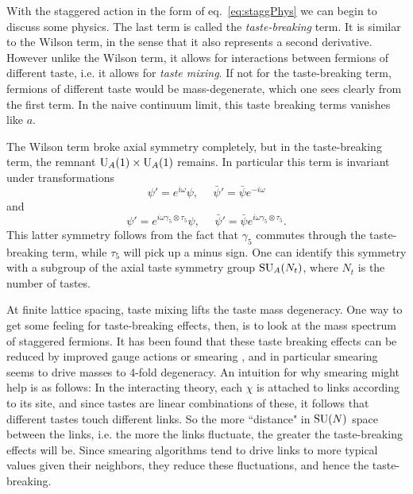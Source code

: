 With the staggered action in the form of eq.~\eqref{eq:staggPhys} we can
begin to discuss some physics. The last term is called the
{\it taste-breaking} term. It is similar to the Wilson term, in the
sense that it also represents a second derivative. However unlike
the Wilson term, it allows for interactions between fermions of
different taste, i.e. it allows for {\it taste mixing}. If not for
the taste-breaking term, fermions of different taste would be mass-degenerate,
which one sees clearly from the first term. In the naive continuum limit,
this taste breaking terms vanishes like $a$.

The Wilson term broke axial symmetry completely, but in the taste-breaking
term, the remnant $\operatorname{U}_A(1)\times\operatorname{U}_A(1)$ remains. In particular this
term is invariant under transformations
\begin{equation}
\psi'=e^{i\omega}\psi, ~~~~~~
          \bar{\psi}'=\bar{\psi}e^{-i\omega}
\end{equation}
and
\begin{equation}
   \psi'=e^{i\omega\gamma_5\otimes\tau_5}\psi, ~~~~~~
          \bar{\psi}'=\bar{\psi}e^{i\omega\gamma_5\otimes\tau_5}.
\end{equation}
This latter symmetry follows from the fact that $\gamma_5$ commutes through
the taste-breaking term, while $\tau_5$ will pick up a minus sign.
One can identify this symmetry with a subgroup of the axial taste
symmetry group $\operatorname{SU}_A(N_t)$, where $N_t$ is the number of tastes.

At finite lattice spacing, taste mixing lifts the taste mass degeneracy.
One way to get some feeling for taste-breaking effects, then, is to look
at the mass spectrum of staggered fermions. It has been found that these
taste breaking effects can be reduced by improved gauge actions or smearing
\cite{durr_staggered_2004,follana_index_2004}, and in particular smearing
seems to drive masses to 4-fold degeneracy. An intuition for why smearing
might help is as follows: In the interacting theory, each $\chi$ is attached
to links according to its site, and since tastes are linear combinations
of these, it follows that different tastes touch different links. So
the more ``distance" in $\operatorname{SU}(N)$ space between the links, i.e. the more
the links fluctuate, the greater the taste-breaking effects will be.
Since smearing algorithms tend to drive links to more typical values
given their neighbors, they reduce these fluctuations, and hence
the taste-breaking.

